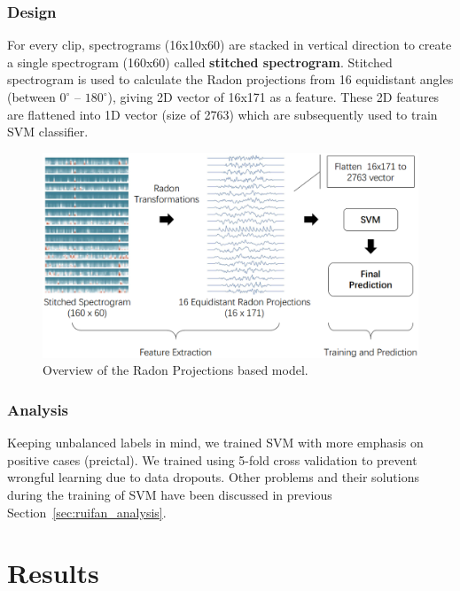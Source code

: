 \documentclass[letterpaper,12pt]{article}
\begin{document}
\subsubsection{Design}
For every clip, spectrograms (16x10x60) are stacked in vertical direction to
create a single spectrogram (160x60) called \textbf{stitched spectrogram}.
Stitched spectrogram is used to calculate the Radon projections from 16
equidistant angles (between $0^\circ$ -- $180^\circ$), giving 2D vector of
16x171 as a feature. These 2D features are flattened into 1D vector (size of
2763) which are subsequently used to train SVM classifier.

\begin{figure}[h]
  \centering
    \includegraphics[scale=0.5]{images/radons.png}
  \caption{Overview of the Radon Projections based model.}
  \label{fig:radon_overview}
\end{figure}


\subsubsection{Analysis}
Keeping unbalanced labels in mind, we trained SVM with more emphasis on positive
cases (preictal). We trained using 5-fold cross validation to prevent wrongful
learning due to data dropouts. Other problems and their solutions during
the training of SVM have been discussed in previous
Section~\ref{sec:ruifan_analysis}.

\section{Results}
\end{document}
